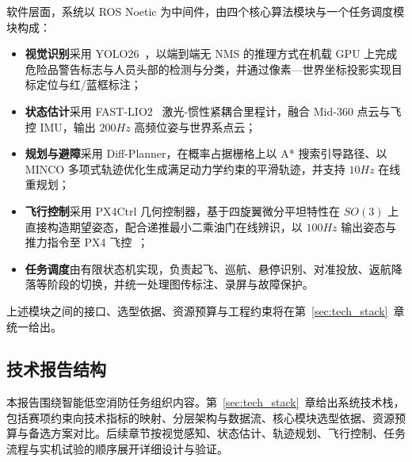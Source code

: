 软件层面，系统以 ROS Noetic 为中间件，由四个核心算法模块与一个任务调度模块构成：

\begin{itemize}
    \item \textbf{视觉识别}采用 YOLO26~\cite{jocher2026yolo26}，以端到端无 NMS 的推理方式在机载 GPU 上完成危险品警告标志与人员头部的检测与分类，并通过像素—世界坐标投影实现目标定位与红/蓝框标注；
    \item \textbf{状态估计}采用 FAST-LIO2~\cite{xu2022fastlio2} 激光-惯性紧耦合里程计，融合 Mid-360 点云与飞控 IMU，输出 $200\unit{Hz}$ 高频位姿与世界系点云；
    \item \textbf{规划与避障}采用 Diff-Planner，在概率占据栅格上以 A* 搜索引导路径、以 MINCO 多项式轨迹优化生成满足动力学约束的平滑轨迹，并支持 $10\unit{Hz}$ 在线重规划；
    \item \textbf{飞行控制}采用 PX4Ctrl 几何控制器，基于四旋翼微分平坦特性在 $SO(3)$ 上直接构造期望姿态，配合递推最小二乘油门在线辨识，以 $100\unit{Hz}$ 输出姿态与推力指令至 PX4 飞控~\cite{meier2015px4}；
    \item \textbf{任务调度}由有限状态机实现，负责起飞、巡航、悬停识别、对准投放、返航降落等阶段的切换，并统一处理图传标注、录屏与故障保护。
\end{itemize}

上述模块之间的接口、选型依据、资源预算与工程约束将在第~\ref{sec:tech_stack}~章统一给出。

\subsection{技术报告结构}

本报告围绕智能低空消防任务组织内容。第~\ref{sec:tech_stack}~章给出系统技术栈，包括赛项约束向技术指标的映射、分层架构与数据流、核心模块选型依据、资源预算与备选方案对比。后续章节按视觉感知、状态估计、轨迹规划、飞行控制、任务流程与实机试验的顺序展开详细设计与验证。
